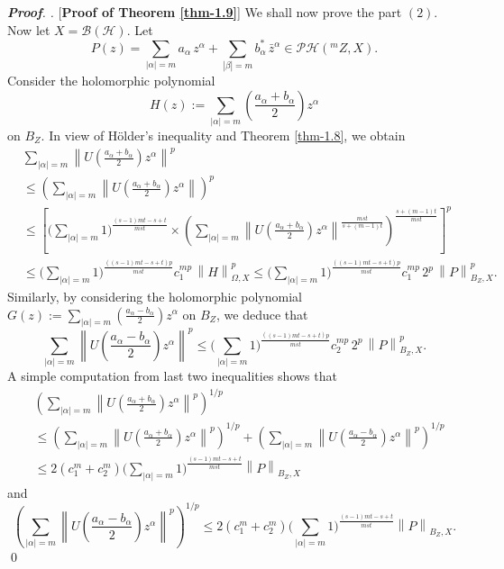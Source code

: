 \documentclass[a4paper,11pt, reqno]{amsart}
\theoremstyle{definition}
\newenvironment{pf}[1][]{%
	\vskip 3mm
	\noindent
	\ifthenelse{\equal{#1}{}}%
	{{\slshape {\bf Proof}. }}%
	{{\slshape #1.} }%
}%
{\qed\bigskip}
\newcommand{\norm}[1]{\left\lVert#1\right\rVert}
\begin{document}
\begin{pf} [{\bf Proof of Theorem \ref{thm-1.9}}]
 We shall now prove the part $(2)$. Now let $X=\mathcal{B}(\mathcal{H})$.
Let 
$$P(z)=\sum_{|\alpha|=m} a_{\alpha}\, z^{\alpha} + \sum_{|\beta|=m} b^{*}_{\alpha}\, \bar{z}^{\alpha} \in \mathcal{PH}(^m Z,X).$$ Consider the holomorphic polynomial $$H(z):=\sum_{|\alpha|=m} \left(\frac{a_{\alpha} + b_{\alpha}}{2}\right)z^{\alpha}$$ on $B_{Z}$. In view of H\"{o}lder's inequality and Theorem \ref{thm-1.8}, we obtain
\begin{align*}
&\sum_{|\alpha|=m} \norm{U\left(\frac{a_{\alpha} + b_{\alpha}}{2}\right)z^{\alpha}}^p \nonumber\\
&\leq  \left(\sum_{|\alpha|=m} \norm{U\left(\frac{a_{\alpha} + b_{\alpha}}{2}\right)z^{\alpha}}\right)^p \nonumber \\
& \leq \left[\bigg(\sum_{|\alpha|=m}1\bigg)^{\frac{(s-1)mt-s+t}{mst}} \times \left(\sum_{|\alpha|=m} \norm{U\left(\frac{a_{\alpha} + b_{\alpha}}{2}\right)z^{\alpha}}^{\frac{mst}{s+(m-1)t}}\right)^{\frac{s+(m-1)t}{mst}}\right]^p \nonumber \\
& \leq \bigg(\sum_{|\alpha|=m}1\bigg)^{\frac{((s-1)mt-s+t)p}{mst}} c_{1}^{mp}\, \norm{H}^p_{\Omega,X} \leq \bigg(\sum_{|\alpha|=m}1\bigg)^{\frac{((s-1)mt-s+t)p}{mst}} c_{1}^{mp}\, 2^p \, \norm{P}^p_{B_{Z},X}.
\end{align*}
Similarly, by considering the holomorphic polynomial $G(z):=\sum_{|\alpha|=m} \left(\frac{a_{\alpha} - b_{\alpha}}{2}\right)z^{\alpha}$ on $B_{Z}$, we deduce that
\begin{equation*}
\sum_{|\alpha|=m} \norm{U\left(\frac{a_{\alpha} - b_{\alpha}}{2}\right)z^{\alpha}}^p \leq \bigg(\sum_{|\alpha|=m}1\bigg)^{\frac{((s-1)mt-s+t)p}{mst}} c_{2}^{mp}\, 2^p \, \norm{P}^p_{B_{Z},X}.
\end{equation*} 
A simple computation from last two inequalities shows that
\begin{align} \label{e-5.8}
&\left(\sum_{|\alpha|=m} \norm{U\left(\frac{a_{\alpha} + b_{\alpha}}{2}\right)z^{\alpha}}^p\right)^{1/p}  \nonumber \\
& \leq \left(\sum_{|\alpha|=m} \norm{U\left(\frac{a_{\alpha} + b_{\alpha}}{2}\right)z^{\alpha}}^p\right)^{1/p} + \left(\sum_{|\alpha|=m} \norm{U\left(\frac{a_{\alpha} - b_{\alpha}}{2}\right)z^{\alpha}}^p\right)^{1/p} \nonumber \\
& \leq 2(c^m_{1}+c^m_2) \bigg(\sum_{|\alpha|=m}1\bigg)^{\frac{(s-1)mt-s+t}{mst}} \norm{P}_{B_{Z},X}
\end{align} 
and 
\begin{equation} \label{e-5.9}
\left(\sum_{|\alpha|=m} \norm{U\left(\frac{a_{\alpha} - b_{\alpha}}{2}\right)z^{\alpha}}^p\right)^{1/p} \leq 2(c^m_{1}+c^m_2) \bigg(\sum_{|\alpha|=m}1\bigg)^{\frac{(s-1)mt-s+t}{mst}} \norm{P}_{B_{Z},X}.

\end{equation}
\end{pf}
\end{document}

